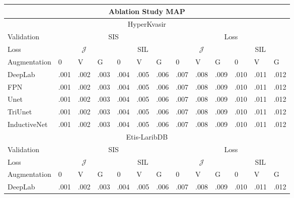 \begin{table}[h]
    \centering
    \noindent
    \scriptsize
        \begin{tabularx}{\linewidth}{lXXXXXXXXXXXX}
            \toprule
            \multicolumn{13}{c}{\textbf{Ablation Study MAP}}\\
            \toprule
            \multicolumn{13}{c}{HyperKvasir}\\
            \midrule
            Validation&\multicolumn{6}{c}{SIS} & \multicolumn{6}{c}{Loss} \\
            \cmidrule(lr){2-7} \cmidrule(lr){8-13}
           Loss &\multicolumn{3}{c}{\(\mathcal{J}\)} & \multicolumn{3}{c}{SIL}&\multicolumn{3}{c}{\(\mathcal{J}\)} & \multicolumn{3}{c}{SIL}\\
            \cmidrule(lr){2-4} \cmidrule(lr){5-7} \cmidrule(lr){8-10} \cmidrule(lr){11-13}
            Augmentation & 0 & V & G & 0 & V & G & 0 & V & G& 0 & V & G\\
            \midrule
            DeepLab & .001 & .002 & .003 & .004 & .005 & .006 & .007 & .008 & .009 & .010 & .011 & .012\\
            FPN & .001 & .002 & .003 & .004 & .005 & .006 & .007 & .008 & .009 & .010 & .011 & .012\\
            Unet & .001 & .002 & .003 & .004 & .005 & .006 & .007 & .008 & .009 & .010 & .011 & .012\\
            TriUnet & .001 & .002 & .003 & .004 & .005 & .006 & .007 & .008 & .009 & .010 & .011 & .012\\
            InductiveNet & .001 & .002 & .003 & .004 & .005 & .006 & .007 & .008 & .009 & .010 & .011 & .012\\
            \midrule
            \multicolumn{13}{c}{Etis-LaribDB}\\
            \midrule
            Validation&\multicolumn{6}{c}{SIS} & \multicolumn{6}{c}{Loss} \\
            \cmidrule(lr){2-7} \cmidrule(lr){8-13}
           Loss &\multicolumn{3}{c}{\(\mathcal{J}\)} & \multicolumn{3}{c}{SIL}&\multicolumn{3}{c}{\(\mathcal{J}\)} & \multicolumn{3}{c}{SIL}\\
            \cmidrule(lr){2-4} \cmidrule(lr){5-7} \cmidrule(lr){8-10} \cmidrule(lr){11-13}
            Augmentation & 0 & V & G & 0 & V & G & 0 & V & G& 0 & V & G\\
            \midrule
            DeepLab & .001 & .002 & .003 & .004 & .005 & .006 & .007 & .008 & .009 & .010 & .011 & .012\\

\end{tabularx}
\end{table}
